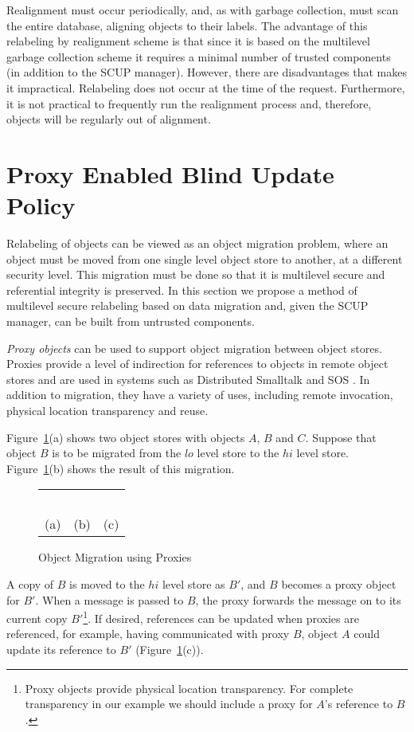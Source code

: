 \begin{ex}
Realignment must occur periodically, and, as with garbage
collection, must scan the entire database, aligning objects to
their labels. The advantage of this relabeling by realignment scheme is
that since it is based on the multilevel garbage collection scheme it
requires a minimal number of trusted components (in addition to the
SCUP manager). However, there are   disadvantages that makes
it impractical.  Relabeling does not occur at the time of the request.
Furthermore, it is not practical to frequently run the realignment
process and, therefore, objects will be regularly out of alignment.
\end{ex}

\section{Proxy Enabled Blind Update Policy} \label{s:proxy}

Relabeling of objects can be viewed as an object migration problem, 
where an object must be moved from one single level object
store to another, at a different security level.  This migration must be done so
that it is multilevel secure and referential integrity is preserved.  In this
section we propose a method of multilevel secure relabeling based on data migration 
and, given the SCUP manager, can be built from untrusted
components.


{\it Proxy objects\/} \cite{corradi:90,decouchant:89,makpangou:88} can
be used to support object migration between object stores.  Proxies
provide a level of indirection for references to objects in remote
object stores and are used in systems such as Distributed Smalltalk
\cite{corradi:90} and
SOS \cite{makpangou:88}.  
In addition to migration, they have a variety of uses, including
remote invocation, physical location transparency and reuse.

\begin{ex} \label{x:proxy}
Figure~\ref{f:proxy}(a) shows two object stores 
with  objects $A$, $B$ and $C$. Suppose that object 
$B$ is to be migrated from the $lo$ level store to the $hi$ level
store. Figure~\ref{f:proxy}(b) shows the result of this
migration. 
\begin{figure}[htb]
\begin{center}
\begin{tabular}{ccc}
 & &~~\\
 (a)  & (b) & (c) 
\end{tabular}
\end{center}
\caption{Object Migration using Proxies \label{f:proxy}} 
\end{figure}
A copy of $B$ is moved to the  $hi$ level store as $B'$, and $B$ becomes a proxy
object for $B'$. When a message is passed to $B$, the proxy forwards
the message on to its current 
copy $B'$\footnote{Proxy objects provide physical location transparency. 
For complete transparency in our example we should include a proxy for $A$'s
reference to $B$.}.  
If  desired, references can be updated when proxies are referenced, for
example,  having communicated with proxy $B$, object $A$ could
update its reference to $B'$ (Figure~\ref{f:proxy}(c)).
\end{ex}

